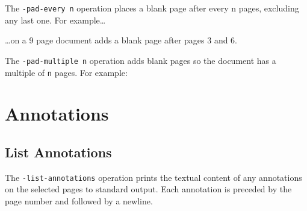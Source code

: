 \documentclass{book}
\begin{document}
  The \verb!-pad-every n! operation places a blank page after every n pages, excluding any last one. For example\ldots

\noindent{}
  \noindent\ldots on a 9 page document adds a blank page after pages 3 and 6.

  The \verb!-pad-multiple n! operation adds blank pages so the document has a multiple of \verb!n! pages. For example:

\noindent{}
 

\chapter{Annotations}
\noindent{}

  \section{List Annotations}
  The \texttt{-list-annotations} operation prints the textual content of any
annotations on the selected pages to standard output. Each annotation is preceded by the page number and followed by a newline.

\noindent{}
\end{document}
